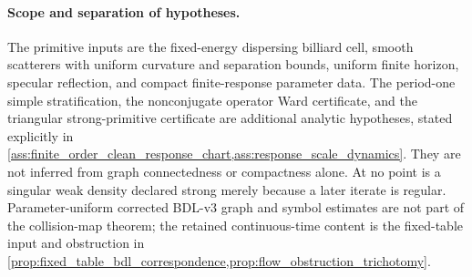 \documentclass[11pt]{amsart}
\theoremstyle{compactplain}
\theoremstyle{compactdefinition}
\theoremstyle{compactremark}
\begin{document}
\paragraph{Scope and separation of hypotheses.}
The primitive inputs are the fixed-energy dispersing billiard cell, smooth
scatterers with uniform curvature and separation bounds, uniform finite
horizon, specular reflection, and compact finite-response parameter data.  The
period-one simple stratification, the nonconjugate operator Ward certificate,
and the triangular strong-primitive certificate are additional analytic
hypotheses, stated explicitly in
\cref{ass:finite_order_clean_response_chart,ass:response_scale_dynamics}.  They
are not inferred from graph connectedness or compactness alone.  At no point
is a singular weak density declared strong merely because a later iterate is
regular.  Parameter-uniform corrected BDL-v3 graph and symbol estimates are
not part of the collision-map theorem; the retained continuous-time content
is the fixed-table input and obstruction in
\cref{prop:fixed_table_bdl_correspondence,prop:flow_obstruction_trichotomy}.
\end{document}
